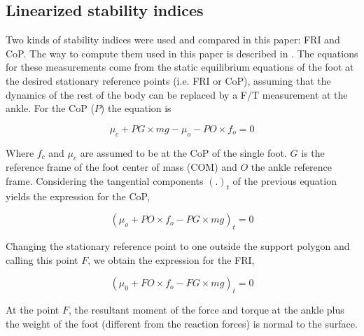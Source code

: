 \documentclass[letterpaper, 10 pt, conference]{ieeeconf}  %
\begin{document}
\subsection{Linearized stability indices}
Two kinds of stability indices were used and compared in this paper: FRI and CoP. The way to compute them used in this paper is described in \cite{Goswami99footrotation}. The equations for these measurements come from the static equilibrium equations of the foot at the desired stationary reference points (i.e. FRI or CoP), assuming that the dynamics of the rest of the body can be replaced by a F/T measurement at the ankle. For the CoP ($P$) the equation is

\begin{equation}
 \mu_c + PG \times m g - \mu_o - PO \times f_o = 0
 \label{eq:footBalance}
\end{equation}

Where $f_c$ and $\mu_c$ are assumed to be at the CoP of the single foot. $G$ is the reference frame of the foot center of mass (COM) and $O$ the ankle reference frame. Considering the tangential components $(.)_t$ of the previous equation yields the expression for the CoP, 

\begin{equation}
 (\mu_o + PO \times f_o - PG \times m g)_t = 0
 \label{eq:CoP}
\end{equation}

Changing the stationary reference point to one outside the support polygon and calling this point $F$, we obtain the expression for the FRI,

\begin{equation}
  (\mu_0 + FO \times f_o - FG \times m g)_t = 0
  \label{eq:FRI}
\end{equation}

At the point $F$, the resultant moment of the force and torque at the ankle plus the weight of the foot (different from the reaction forces) is normal to the surface.
\end{document}
